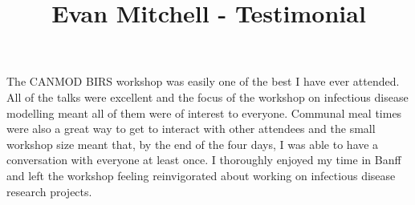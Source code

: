 \documentclass[12pt]{article}
\title{Evan Mitchell - Testimonial}
\author{}
\date{}
\begin{document}
\maketitle

The CANMOD BIRS workshop was easily one of the best I have ever attended. All of the talks were excellent and the focus of the workshop on infectious disease modelling meant all of them were of interest to everyone. Communal meal times were also a great way to get to interact with other attendees and the small workshop size meant that, by the end of the four days, I was able to have a conversation with everyone at least once. I thoroughly enjoyed my time in Banff and left the workshop feeling reinvigorated about working on infectious disease research projects.
\end{document}
